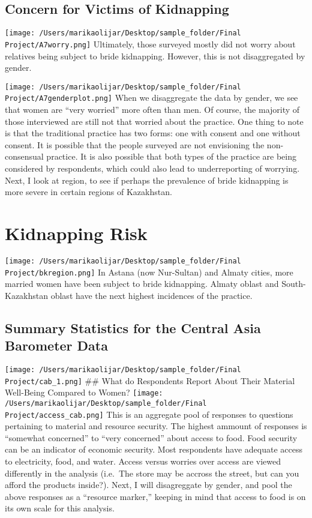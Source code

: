 \documentclass[
  english,
  man]{apa6}
\begin{document}
\hypertarget{concern-for-victims-of-kidnapping}{%
\subsection{Concern for Victims of Kidnapping}\label{concern-for-victims-of-kidnapping}}

\texttt{[image: /Users/marikaolijar/Desktop/sample\_folder/Final Project/A7worry.png]}
Ultimately, those surveyed mostly did not worry about relatives being subject to bride kidnapping. However, this is not disaggregated by gender.

\texttt{[image: /Users/marikaolijar/Desktop/sample\_folder/Final Project/A7genderplot.png]}
When we disaggregate the data by gender, we see that women are ``very worried'' more often than men. Of course, the majority of those interviewed are still not that worried about the practice. One thing to note is that the traditional practice has two forms: one with consent and one without consent. It is possible that the people surveyed are not envisioning the non-consensual practice. It is also possible that both types of the practice are being considered by respondents, which could also lead to underreporting of worrying. Next, I look at region, to see if perhaps the prevalence of bride kidnapping is more severe in certain regions of Kazakhstan.

\hypertarget{kidnapping-risk}{%
\section{Kidnapping Risk}\label{kidnapping-risk}}

\texttt{[image: /Users/marikaolijar/Desktop/sample\_folder/Final Project/bkregion.png]}
In Astana (now Nur-Sultan) and Almaty cities, more married women have been subject to bride kidnapping. Almaty oblast and South-Kazakhstan oblast have the next highest incidences of the practice.

\hypertarget{summary-statistics-for-the-central-asia-barometer-data}{%
\subsection{Summary Statistics for the Central Asia Barometer Data}\label{summary-statistics-for-the-central-asia-barometer-data}}

\texttt{[image: /Users/marikaolijar/Desktop/sample\_folder/Final Project/cab\_1.png]}
\#\# What do Respondents Report About Their Material Well-Being Compared to Women?
\texttt{[image: /Users/marikaolijar/Desktop/sample\_folder/Final Project/access\_cab.png]}
This is an aggregate pool of responses to questions pertaining to material and resource security. The highest ammount of responses is ``somewhat concerned'' to ``very concerned'' about access to food. Food security can be an indicator of economic security. Most respondents have adequate access to electricity, food, and water. Access versus worries over access are viewed differently in the analysis (i.e.~The store may be accross the street, but can you afford the products inside?). Next, I will disagreggate by gender, and pool the above responses as a ``resource marker,'' keeping in mind that access to food is on its own scale for this analysis.
\end{document}
